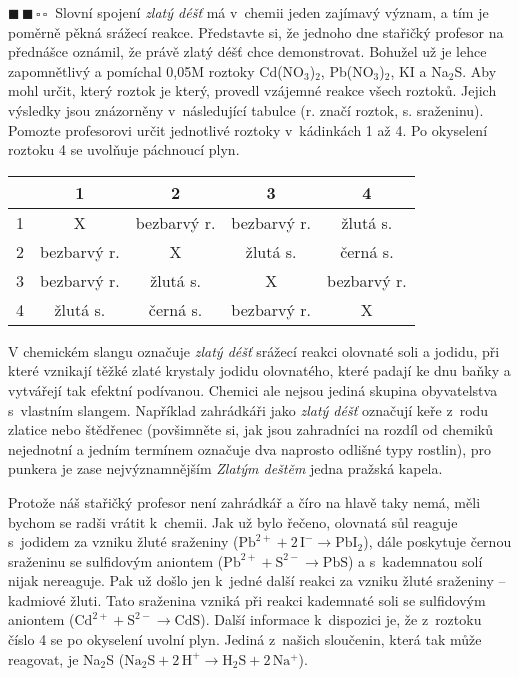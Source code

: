 \documentclass{book}
\newcommand{\dva}{$\blacksquare \, \blacksquare \, \square \, \square \; \; $}
\renewenvironment{quotation}{\par}{\par} %
\begin{document}
\begin{quotation}
\dva Slovní spojení \textit{zlatý déšť} má v~chemii jeden zajímavý význam,
a tím je poměrně pěkná srážecí reakce. Představte si, že jednoho dne
stařičký profesor na přednášce oznámil, že právě zlatý déšť chce demonstrovat.
Bohužel už je lehce zapomnětlivý a pomíchal 0,05M roztoky Cd(NO$_{3}$)$_{2}$,
Pb(NO$_{3}$)$_{2}$, KI a Na$_{2}$S. Aby mohl určit, který roztok
je který, provedl vzájemné reakce všech roztoků. Jejich výsledky jsou
znázorněny v~následující tabulce (r. značí roztok, s. sraženinu). Pomozte profesorovi určit jednotlivé
roztoky v~kádinkách 1 až 4. Po okyselení roztoku 4 se uvolňuje páchnoucí
plyn.
\begin{center}
\begin{tabular}{c|c|c|c|c}

 & 1 & 2 & 3 & 4\tabularnewline
\hline 
1 & X & bezbarvý r. & bezbarvý r. & žlutá s.\tabularnewline
\hline 
2 & bezbarvý r. & X & žlutá s. & černá s.\tabularnewline
\hline 
3 & bezbarvý r. & žlutá s. & X & bezbarvý r.\tabularnewline
\hline 
4 & žlutá s. & černá s. & bezbarvý r. & X\tabularnewline

\end{tabular}
\end{center}

\end{quotation} \dotfill \par 
V chemickém slangu označuje \textit{zlatý déšť} srážecí reakci
olovnaté soli a jodidu, při které vznikají těžké zlaté krystaly jodidu
olovnatého, které padají ke dnu baňky a vytvářejí tak efektní podívanou.
Chemici ale nejsou jediná skupina obyvatelstva s~vlastním slangem.
Například zahrádkáři jako \textit{zlatý déšť} označují keře z~rodu zlatice
nebo štědřenec (povšimněte si, jak jsou zahradníci na rozdíl od chemiků
nejednotní a jedním termínem označuje dva naprosto odlišné typy rostlin),
pro punkera je zase nejvýznamnějším \textit{Zlatým deštěm} jedna pražská kapela.

Protože náš stařičký profesor není zahrádkář a číro na hlavě taky
nemá, měli bychom se radši vrátit k~chemii. Jak už bylo řečeno, olovnatá
sůl reaguje s~jodidem za vzniku žluté sraženiny ($\mathrm{Pb^{2+}+2\,I^{-}\rightarrow PbI_{2}}$),
dále poskytuje černou sraženinu se sulfidovým aniontem ($\mathrm{Pb^{2+}+S^{2-}\rightarrow PbS}$)
a s~kademnatou solí nijak nereaguje. Pak už došlo jen k~jedné další
reakci za vzniku žluté sraženiny -- kadmiové žluti. Tato sraženina
vzniká při reakci kademnaté soli se sulfidovým aniontem ($\mathrm{Cd^{2+}+S^{2-}\rightarrow CdS}$).
Další informace k~dispozici je, že z~roztoku číslo 4
se po okyselení uvolní plyn. Jediná z~našich sloučenin, která tak
může reagovat, je Na$_{2}$S ($\mathrm{Na_{2}S+2\,H^{+}\rightarrow H_{2}S+2\,Na^{+}}$).
\end{document}
